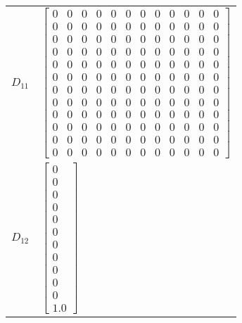 \begin{tabular}{cl}
 $D_{11}$ & $\left[\begin{array}{cccccccccccc}0 & 0 & 0 & 0 & 0 & 0 & 0 & 0 & 0 & 0 & 0 & 0\\0 & 0 & 0 & 0 & 0 & 0 & 0 & 0 & 0 & 0 & 0 & 0\\0 & 0 & 0 & 0 & 0 & 0 & 0 & 0 & 0 & 0 & 0 & 0\\0 & 0 & 0 & 0 & 0 & 0 & 0 & 0 & 0 & 0 & 0 & 0\\0 & 0 & 0 & 0 & 0 & 0 & 0 & 0 & 0 & 0 & 0 & 0\\0 & 0 & 0 & 0 & 0 & 0 & 0 & 0 & 0 & 0 & 0 & 0\\0 & 0 & 0 & 0 & 0 & 0 & 0 & 0 & 0 & 0 & 0 & 0\\0 & 0 & 0 & 0 & 0 & 0 & 0 & 0 & 0 & 0 & 0 & 0\\0 & 0 & 0 & 0 & 0 & 0 & 0 & 0 & 0 & 0 & 0 & 0\\0 & 0 & 0 & 0 & 0 & 0 & 0 & 0 & 0 & 0 & 0 & 0\\0 & 0 & 0 & 0 & 0 & 0 & 0 & 0 & 0 & 0 & 0 & 0\\0 & 0 & 0 & 0 & 0 & 0 & 0 & 0 & 0 & 0 & 0 & 0\end{array}\right]$                                                                                                                                                 \\
 $D_{12}$ & $\left[\begin{matrix}0\\0\\0\\0\\0\\0\\0\\0\\0\\0\\0\\1.0\end{matrix}\right]$                                                                                                                                                                                                                                                                                                                                                                                                                                                                                                                                                                                                                                                                                                           \\

\end{tabular}
